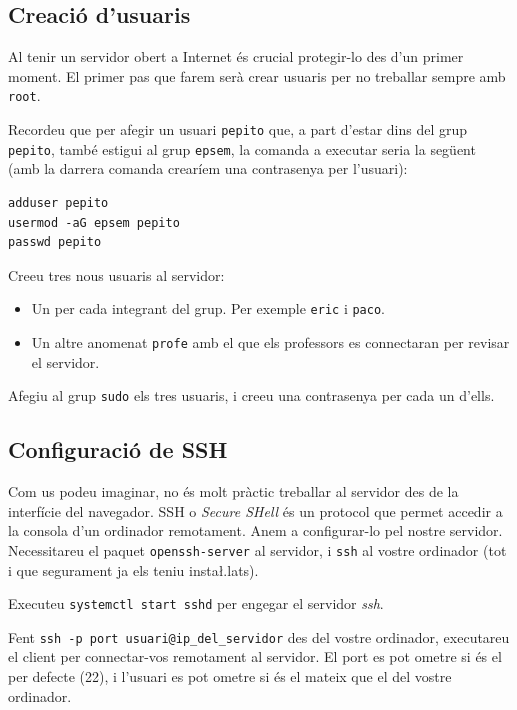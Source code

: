 \documentclass{practicaitic}
\begin{document}
\subsection{Creació d'usuaris}

Al tenir un servidor obert a Internet és crucial protegir-lo des d'un primer
moment. El primer pas que farem serà crear usuaris per no treballar sempre
amb \texttt{root}.

Recordeu que per afegir un usuari \texttt{pepito} que, a part d'estar dins del
grup \texttt{pepito}, també estigui al grup \texttt{epsem}, la comanda a executar
seria la següent (amb la darrera comanda crearíem una contrasenya per l'usuari):
\begin{verbatim}
adduser pepito
usermod -aG epsem pepito
passwd pepito
\end{verbatim}

\begin{previ}
Creeu tres nous usuaris al servidor:
\begin{itemize}
  \item Un per cada integrant del grup. Per exemple \texttt{eric} i \texttt{paco}.
  \item Un altre anomenat \texttt{profe} amb el que els professors es connectaran
  per revisar el servidor.
\end{itemize}
Afegiu al grup \texttt{sudo} els tres usuaris, i creeu una contrasenya per
cada un d'ells.
\end{previ}

\subsection{Configuració de SSH}

Com us podeu imaginar, no és molt pràctic treballar al servidor des de la
interfície del navegador. SSH o \textit{Secure SHell} és un protocol que permet
accedir a la consola d'un ordinador remotament. Anem a configurar-lo pel nostre
servidor. Necessitareu el paquet \texttt{openssh-server} al servidor, i \texttt{ssh}
al vostre ordinador (tot i que segurament ja els teniu insta\l.lats).

\begin{previ}
Executeu \texttt{systemctl start sshd} per engegar el servidor \textit{ssh}.
\end{previ}

Fent \texttt{ssh -p port usuari@ip\_del\_servidor} des del vostre
ordinador, executareu el client per connectar-vos remotament al
servidor. El port es pot ometre si és el per defecte (22), i l'usuari
es pot ometre si és el mateix que el del vostre ordinador.
\end{document}
